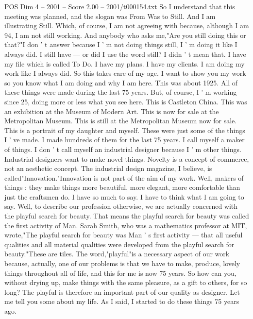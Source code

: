 \begin{textsample}{POS Dim 4 – 2001 – Score 2.00 – 2001/t000154.txt}  \label{ex:f4_pos_081}
So I understand that this meeting was planned, and the slogan was From Was to Still.
And I am illustrating Still.
Which, of course, I am not agreeing with because, although I am 94, I am not still working.
And anybody who asks me,"Are you still doing this or that?"I don ' t answer because I ' m not doing things still, I ' m doing it like I always did.
I still have — or did I use the word still?
I didn ' t mean that.
I have my file which is called To Do.
I have my plans.
I have my clients.
I am doing my work like I always did.
So this takes care of my age.
I want to show you my work so you know what I am doing and why I am here.
This was about 1925.
All of these things were made during the last 75 years.
But, of course, I ' m working since 25, doing more or less what you see here.
This is Castleton China.
This was an exhibition at the Museum of Modern Art.
This is now for sale at the Metropolitan Museum.
This is still at the Metropolitan Museum now for sale.
This is a portrait of my daughter and myself.
These were just some of the things I ' ve made.
I made hundreds of them for the last 75 years.
I call myself a maker of things.
I don ' t call myself an industrial designer because I ' m other things.
Industrial designers want to make novel things.
Novelty is a concept of commerce, not an aesthetic concept.
The industrial design magazine, I believe, is called"Innovation."Innovation is not part of the aim of my work.
Well, makers of things : they make things more beautiful, more elegant, more comfortable than just the craftsmen do.
I have so much to say.
I have to think what I am going to say.
Well, to describe our profession otherwise, we are actually concerned with the playful search for beauty.
That means the playful search for beauty was called the first activity of Man.
Sarah Smith, who was a mathematics professor at MIT, wrote,"The playful search for beauty was Man ' s first activity — that all useful qualities and all material qualities were developed from the playful search for beauty."These are tiles.
The word,"playful"is a necessary aspect of our work because, actually, one of our problems is that we have to make, produce, lovely things throughout all of life, and this for me is now 75 years.
So how can you, without drying up, make things with the same pleasure, as a gift to others, for so long?
The playful is therefore an important part of our quality as designer.
Let me tell you some about my life.
As I said, I started to do these things 75 years ago.

\end{textsample}
